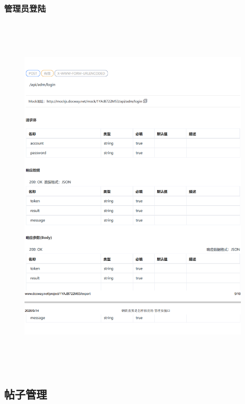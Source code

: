\subsubsection{管理员登陆}
\begin{figure}[h]
    \centering
    \includegraphics[height=18.0cm,width=14.0cm]{design/image/api33.png} 
    \end{figure}  
    \newpage
\subsection{帖子管理}
